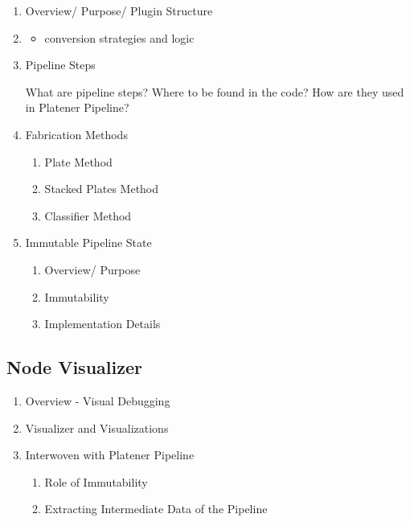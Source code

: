 \documentclass[../ClassicThesis.tex]{subfiles}
\begin{document}
\begin{enumerate}
\item Overview/ Purpose/ Plugin Structure

\item \begin{itemize}
  \item conversion strategies and logic
  \end{itemize}

\item Pipeline Steps

  What are pipeline steps? Where to be found in the code? How are they used in
  Platener Pipeline?

\item Fabrication Methods


  \begin{enumerate}
  \item Plate Method


  \item Stacked Plates Method


  \item Classifier Method

  \end{enumerate}

\item Immutable Pipeline State


  \begin{enumerate}
  \item Overview/ Purpose


  \item Immutability


  \item Implementation Details

  \end{enumerate}
\end{enumerate}

\subsection{Node Visualizer}


\begin{enumerate}
\item Overview - Visual Debugging


\item Visualizer and Visualizations


\item Interwoven with Platener Pipeline


  \begin{enumerate}
  \item Role of Immutability


  \item Extracting Intermediate Data of the Pipeline

  \end{enumerate}
\end{enumerate}
\end{document}
